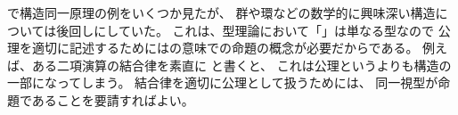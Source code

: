 \documentclass[index]{subfiles}
\begin{document}

で構造同一原理の例をいくつか見たが、
群や環などの数学的に興味深い構造については後回しにしていた。
これは、型理論において「」は単なる型なので
公理を適切に記述するためにはの意味での命題の概念が必要だからである。
例えば、ある二項演算\myInlineMath{\times}の結合律を素直に
と書くと、
これは公理というよりも構造の一部になってしまう。
結合律を適切に公理として扱うためには、
同一視型が命題であることを要請すればよい。


\end{document}
